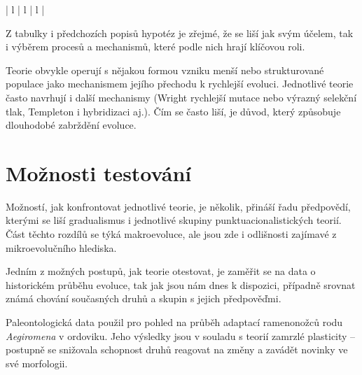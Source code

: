 \begin{longtable}{| l | l | l |}
 \\

\hline
\end{longtable}
\normalsize

Z tabulky i předchozích popisů hypotéz je zřejmé, že se liší jak svým účelem, tak i výběrem procesů a mechanismů,
které podle nich hrají klíčovou roli.

Teorie obvykle operují s nějakou formou vzniku menší nebo strukturované populace jako mechanismem jejího přechodu
k rychlejší evoluci. Jednotlivé teorie často navrhují i další mechanismy (Wright rychlejší mutace nebo výrazný
selekční tlak, Templeton i hybridizaci aj.). Čím se často liší, je důvod, který způsobuje dlouhodobé zabrždění evoluce.


\section{Možnosti testování}

Možností, jak konfrontovat jednotlivé teorie, je několik, \citet[str. 4-5]{flegr2013} přináší řadu
předpovědí, kterými se liší gradualismus i jednotlivé skupiny punktuacionalistických teorií. Část těchto rozdílů se
týká makroevoluce, ale jsou zde i odlišnosti zajímavé z mikroevolučního hlediska.

Jedním z možných postupů, jak teorie otestovat, je zaměřit se na data o historickém průběhu evoluce, tak jak jsou nám
dnes k dispozici, případně srovnat známá chování současných druhů a skupin s jejich předpověďmi.

Paleontologická data použil \citet{mikulavs2008} pro pohled na průběh adaptací ramenonožců rodu \textit{Aegiromena} v
ordoviku. Jeho výsledky jsou v souladu s teorií zamrzlé plasticity -- postupně se snižovala schopnost druhů reagovat
na změny a zavádět novinky ve své morfologii.


